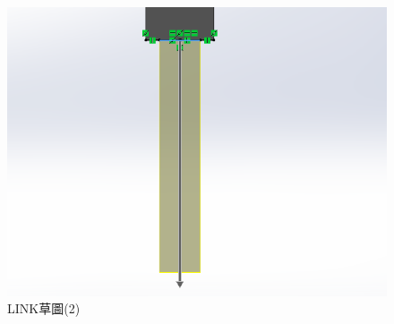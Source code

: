 \begin{figure}[h!]
    \centering
    \begin{minipage}[b]{0.6\textwidth}
        \centering
        \includegraphics[width=\textwidth,height=0.30\textheight]{./../images/6-1-42}
        \caption{LINK草圖(2)}
        \label{fig:platform}
    \end{minipage}
    \hfill
    \begin{minipage}[b]{0.35\textwidth}
        \centering

\end{minipage}
\end{figure}
